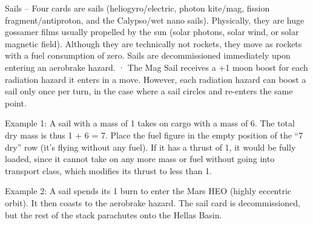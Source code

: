 \documentclass[a4paper]{book}
\begin{document}
Sails – Four cards are sails (heliogyro/electric, photon kite/mag, fission fragment/antiproton, and the Calypso/wet nano sails). Physically, they are huge gossamer films usually propelled by the sun (solar photons, solar wind, or solar magnetic field). Although they are technically not rockets, they move as rockets with a fuel consumption of zero.
Sails are decommissioned immediately upon entering an aerobrake hazard.
·       The Mag Sail receives a +1 moon boost for each radiation hazard it enters in a move. However, each radiation hazard can boost a sail only once per turn, in the case where a sail circles and re-enters the same point.


Example 1: A sail with a mass of 1 takes on cargo with a mass of 6. The total dry mass is thus 1 + 6 = 7. Place the fuel figure in the empty position of the “7 dry” row (it’s flying without any fuel). If it has a thrust of 1, it would be fully loaded, since it cannot take on any more mass or fuel without going into transport class, which modifies its thrust to less than 1.

Example 2: A sail spends its 1 burn to enter the Mars HEO (highly eccentric orbit). It then coasts to the aerobrake hazard. The sail card is decommissioned, but the rest of the stack parachutes onto the Hellas Basin.
\end{document}
